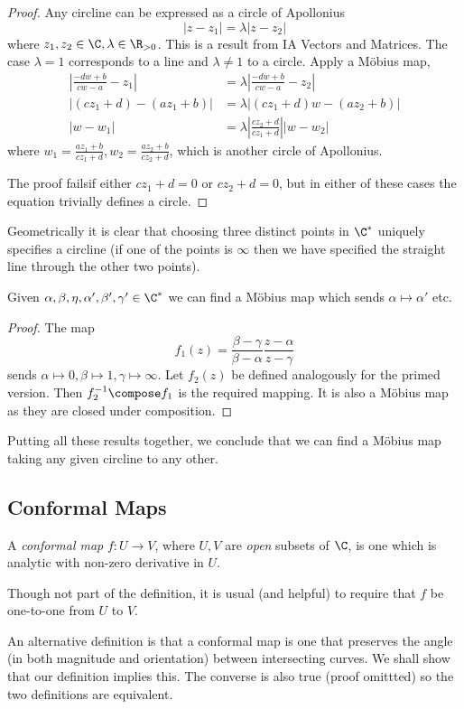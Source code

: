 \documentclass[a4paper]{article}
\begin{document}
\begin{proof}
  Any circline can be expressed as a circle of Apollonius
  \[
    |z - z_1| = \lambda|z - z_2|
  \]
  where \(z_1, z_2  \in \C, \lambda \in \R_{> 0}\). This is a result from IA Vectors and Matrices. The case \(\lambda = 1\) corresponds to a line and \(\lambda \neq 1\) to a circle. Apply a Möbius map,
  \begin{align*}
    \left| \frac{-dw + b}{cw - a} - z_1 \right| &= \lambda \left| \frac{-dw + b}{cw - a} - z_2 \right| \\
    |(cz_1 + d) - (az_1 + b)| &= \lambda|(cz_1 + d)w - (az_2 + b)| \\
    |w - w_1| &= \lambda \left| \frac{cz_2 + d}{cz_1 + d} \right| |w - w_2|
  \end{align*}
  where \(w_1 = \frac{az_1 + b}{cz_1 + d}, w_2 = \frac{az_2 + b}{cz_2 + d}\), which is another circle of Apollonius.

  The proof failsif either \(cz_1 + d = 0\) or \(cz_2 + d = 0\), but in either of these cases the equation trivially defines a circle.
\end{proof}

Geometrically it is clear that choosing three distinct points in \(\C^*\) uniquely specifies a circline (if one of the points is \(\infty\) then we have specified the straight line through the other two points).

Given \(\alpha, \beta, \eta, \alpha', \beta', \gamma' \in \C^*\) we can find a Möbius map which sends \(\alpha \mapsto \alpha'\) etc.

\begin{proof}
  The map
  \[
    f_1(z) = \frac{\beta - \gamma}{\beta - \alpha}\frac{z - \alpha}{z - \gamma}
  \]
  sends \(\alpha \mapsto 0, \beta \mapsto 1, \gamma \mapsto \infty\). Let \(f_2(z)\) be defined analogously for the primed version. Then \(f_2^{-1} \compose f_1\) is the required mapping. It is also a Möbius map as they are closed under composition.
\end{proof}

Putting all these results together, we conclude that we can find a Möbius map taking any given circline to any other.

\subsection{Conformal Maps}

\begin{definition}
  A \emph{conformal map} \(f: U \to V\), where \(U, V\) are \emph{open} subsets of \(\C\), is one which is analytic with non-zero derivative in \(U\).
\end{definition}

Though not part of the definition, it is usual (and helpful) to require that \(f\) be one-to-one from \(U\) to \(V\).

An alternative definition is that a conformal map is one that preserves the angle (in both magnitude and orientation) between intersecting curves. We shall show that our definition implies this. The converse is also true (proof omittted) so the two definitions are equivalent.
\end{document}
